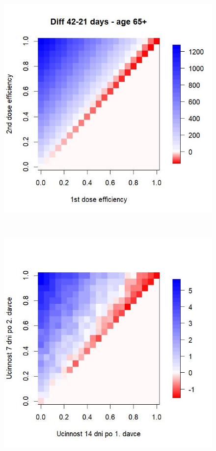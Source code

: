 \begin{figure}[h]
\begin{center}
\begin{minipage}[m]{0.3\linewidth}
		\end{minipage}
		\begin{minipage}[m]{0.3\linewidth}
			\includegraphics[width=\textwidth]{pic/SM_DIFF_mean_T.jpg}
		\end{minipage} \\[1ex]
		\begin{minipage}[m]{0.3\linewidth}
			\includegraphics[width=\textwidth]{pic/AP_DIFF_mean_T.jpg}

\end{minipage}
\end{center}
\end{figure}
